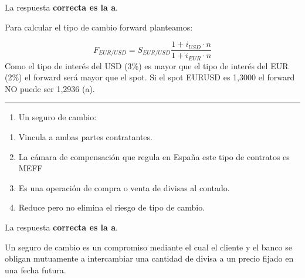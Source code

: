 \documentclass[
  letterpaper,
  DIV=11,
  numbers=noendperiod]{scrreprt}
\providecommand{\tightlist}{%
  \setlength{\itemsep}{0pt}\setlength{\parskip}{0pt}}\usepackage{longtable,booktabs,array}
\begin{document}
\begin{tcolorbox}[enhanced jigsaw, left=2mm, opacityback=0, colback=white, breakable, arc=.35mm, bottomrule=.15mm, rightrule=.15mm, toprule=.15mm, leftrule=.75mm, colframe=quarto-callout-tip-color-frame]
\begin{minipage}[t]{5.5mm}
\textcolor{quarto-callout-tip-color}{\faLightbulb}
\end{minipage}%
\begin{minipage}[t]{\textwidth - 5.5mm}

La respuesta \textbf{correcta es la a}.

Para calcular el tipo de cambio forward planteamos:

\[F_{EUR/USD}=S_{EUR/USD}\frac{1+i_{USD}\cdot n}{1+i_{EUR}\cdot n}\]
Como el tipo de interés del USD (3\%) es mayor que el tipo de interés
del EUR (2\%) el forward será mayor que el spot. Si el spot EURUSD es
1,3000 el forward NO puede ser 1,2936 (a).

\end{minipage}%
\end{tcolorbox}

\begin{center}\rule{0.5\linewidth}{0.5pt}\end{center}

\begin{enumerate}
\def\labelenumi{\arabic{enumi}.}
\setcounter{enumi}{28}
\tightlist
\item
  Un seguro de cambio:
\end{enumerate}

\begin{enumerate}
\def\labelenumi{\alph{enumi}.}
\item
  Vincula a ambas partes contratantes.
\item
  La cámara de compensación que regula en España este tipo de contratos
  es MEFF
\item
  Es una operación de compra o venta de divisas al contado.
\item
  Reduce pero no elimina el riesgo de tipo de cambio.
\end{enumerate}

\begin{tcolorbox}[enhanced jigsaw, left=2mm, opacityback=0, colback=white, breakable, arc=.35mm, bottomrule=.15mm, rightrule=.15mm, toprule=.15mm, leftrule=.75mm, colframe=quarto-callout-tip-color-frame]
\begin{minipage}[t]{5.5mm}
\textcolor{quarto-callout-tip-color}{\faLightbulb}
\end{minipage}%
\begin{minipage}[t]{\textwidth - 5.5mm}

La respuesta \textbf{correcta es la a}.

Un seguro de cambio es un compromiso mediante el cual el cliente y el
banco se obligan mutuamente a intercambiar una cantidad de divisa a un
precio fijado en una fecha futura.

\end{minipage}%
\end{tcolorbox}
\end{document}
